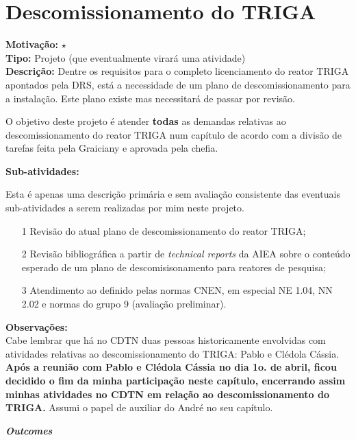 \chapter{Descomissionamento do TRIGA}

\textbf{Motivação:} $\star$\\

\textbf{Tipo:} Projeto (que eventualmente virará  uma atividade)\\

\textbf{Descrição:} Dentre os requisitos para o completo licenciamento do reator TRIGA apontados pela DRS, está a necessidade de um plano de descomissionamento para a instalação. Este plano existe mas necessitará de passar por revisão. 

O objetivo deste projeto é atender \textbf{todas} as demandas relativas ao descomissionamento do reator TRIGA num capítulo de acordo com a divisão de tarefas 
feita pela Graiciany e aprovada pela chefia.

\textbf{Sub-atividades:}

Esta é apenas uma descrição primária e sem avaliação consistente das eventuais 
sub-atividades a serem realizadas por mim neste projeto.

\begin{itemize}
	\item[1] Revisão do atual plano de descomissionamento do reator TRIGA;
	\item[2] Revisão bibliográfica a partir de \textit{technical reports} da AIEA 
	sobre o conteúdo esperado de um plano de descomisisonamento para reatores de pesquisa;
	\item[3] Atendimento ao definido pelas normas CNEN, em especial NE 1.04, NN 2.02 e normas do grupo 9 (avaliação preliminar).
\end{itemize}

\textbf{Observações:}\\

Cabe lembrar que há no CDTN duas pessoas historicamente envolvidas com atividades relativas ao descomissionamento do TRIGA: Pablo e Clédola Cássia.\\

\textbf{Após a reunião com Pablo e Clédola Cássia no dia 1o. de abril, ficou decidido o fim da minha participação neste capítulo, encerrando assim minhas atividades no CDTN em relação ao descomissionamento do TRIGA.} Assumi o papel 
de auxiliar do André no seu capítulo.

\textbf{\textit{Outcomes}}

